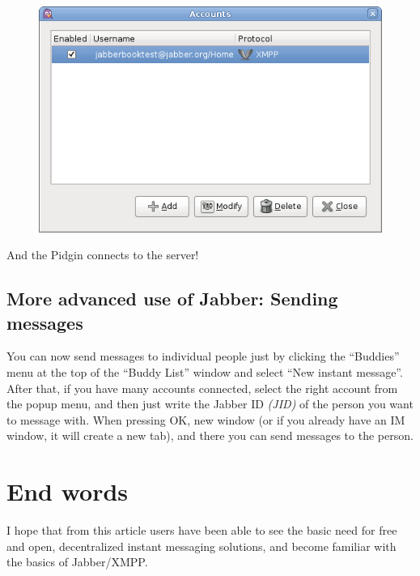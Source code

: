 \begin{figure}
    \includegraphics[scale=0.40]{./media/jabber_pidgin_accounts_2}
\end{figure}

And the Pidgin connects to the server!


\subsection{More advanced use of Jabber: Sending messages}
\label{ss:jim_client_server:using_jabber:advanced_use}

You can now send messages to individual people just by clicking the ``Buddies''
menu at the top of the  ``Buddy List'' window and select ``New instant
message''. After that, if you have many accounts connected, select the right
account from the popup menu, and then just write the Jabber ID \textit{(JID)} of
the person you want to message with. When pressing OK, new window (or if you
already have an IM window, it will create a new tab), and there you can send
messages to the person.


\section{End words}
\label{s:jim_client_server:end_words}

I hope that from this article users have been able to see the basic need for
free and open, decentralized instant messaging solutions, and become familiar
with the basics of Jabber/XMPP.





